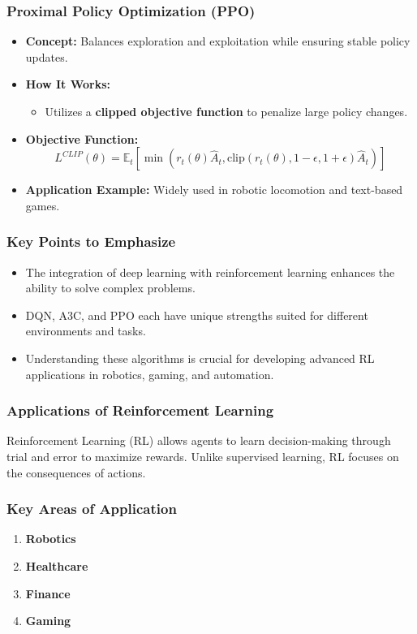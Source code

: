 \documentclass{beamer}
\begin{document}
\begin{frame}[fragile]
    \frametitle{Proximal Policy Optimization (PPO)}
    \begin{itemize}
        \item \textbf{Concept:} Balances exploration and exploitation while ensuring stable policy updates.
        \item \textbf{How It Works:}
        \begin{itemize}
            \item Utilizes a \textbf{clipped objective function} to penalize large policy changes.
        \end{itemize}
        \item \textbf{Objective Function:}
        \begin{equation}
            L^{CLIP}(\theta) = \mathbb{E}_t \left[ \min \left( r_t(\theta) \hat{A}_t, \text{clip}(r_t(\theta), 1 - \epsilon, 1 + \epsilon) \hat{A}_t \right) \right]
        \end{equation}
        \item \textbf{Application Example:} Widely used in robotic locomotion and text-based games.
    \end{itemize}
\end{frame}

\begin{frame}[fragile]
    \frametitle{Key Points to Emphasize}
    \begin{itemize}
        \item The integration of deep learning with reinforcement learning enhances the ability to solve complex problems.
        \item DQN, A3C, and PPO each have unique strengths suited for different environments and tasks.
        \item Understanding these algorithms is crucial for developing advanced RL applications in robotics, gaming, and automation.
    \end{itemize}
\end{frame}

\begin{frame}
    \frametitle{Applications of Reinforcement Learning}
    Reinforcement Learning (RL) allows agents to learn decision-making through trial and error to maximize rewards. Unlike supervised learning, RL focuses on the consequences of actions.
\end{frame}

\begin{frame}
    \frametitle{Key Areas of Application}
    \begin{enumerate}
        \item \textbf{Robotics}
        \item \textbf{Healthcare}
        \item \textbf{Finance}
        \item \textbf{Gaming}
    \end{enumerate}
\end{frame}
\end{document}
